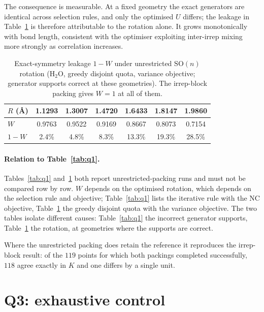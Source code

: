 \documentclass[11pt]{article}
\begin{document}
The consequence is measurable. At a fixed geometry the exact generators are
identical across selection rules, and only the optimised $U$ differs; the
leakage in Table~\ref{tab:q2} is therefore attributable to the rotation alone.
It grows monotonically with bond length, consistent with the optimiser
exploiting inter-irrep mixing more strongly as correlation increases.

\begin{table}[htbp]
\centering
\caption{Exact-symmetry leakage $1-W$ under unrestricted $\mathrm{SO}(n)$
rotation ($\mathrm{H_2O}$, greedy disjoint quota, variance objective; generator
supports correct at these geometries). The irrep-block packing gives $W=1$ at
all of them.}
\label{tab:q2}
\begin{tabular}{lcccccc}
\toprule
$R$ (\AA) & 1.1293 & 1.3007 & 1.4720 & 1.6433 & 1.8147 & 1.9860 \\
\midrule
$W$   & 0.9763 & 0.9522 & 0.9169 & 0.8667 & 0.8073 & 0.7154 \\
$1-W$ & 2.4\%  & 4.8\%  & 8.3\%  & 13.3\% & 19.3\% & 28.5\% \\
\bottomrule
\end{tabular}
\end{table}

\paragraph{Relation to Table~\ref{tab:q1}.}
Tables~\ref{tab:q1} and~\ref{tab:q2} both report unrestricted-packing runs and
must not be compared row by row. $W$ depends on the optimised rotation, which
depends on the selection rule and objective; Table~\ref{tab:q1} lists the
iterative rule with the NC objective, Table~\ref{tab:q2} the greedy disjoint
quota with the variance objective. The two tables isolate different causes:
Table~\ref{tab:q1} the incorrect generator supports, Table~\ref{tab:q2} the
rotation, at geometries where the supports are correct.

Where the unrestricted packing does retain the reference it reproduces the
irrep-block result: of the $119$ points for which both packings completed
successfully, $118$ agree exactly in $K$ and one differs by a single unit.

\section{Q3: exhaustive control}
\label{sec:q3}
\end{document}
